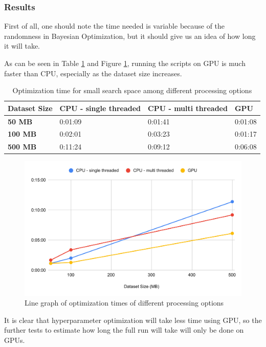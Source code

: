 \documentclass[12pt,twoside]{report}
\begin{document}
\subsubsection{Results}

First of all, one should note the time needed is variable because of the randomness in Bayesian Optimization, but it should give us an idea of how long it will take.

As can be seen in Table \ref{tab:cpu-gpu} and Figure \ref{fig:cpu-gpu}, running the scripts on GPU is much faster than CPU, especially as the dataset size increases.

\begin{table}[h]
\centering
\begin{tabular}{|l|l|l|l|}
\hline
\textbf{Dataset Size} & \textbf{CPU - single threaded} & \textbf{CPU - multi threaded} & \textbf{GPU} \\ \hline
\textbf{50 MB}  & 0:01:09 & 0:01:41 & 0:01:08 \\ \hline
\textbf{100 MB} & 0:02:01 & 0:03:23 & 0:01:17 \\ \hline
\textbf{500 MB} & 0:11:24 & 0:09:12 & 0:06:08 \\ \hline
\end{tabular}
\caption{Optimization time for small search space among different processing options}
\label{tab:cpu-gpu}
\end{table}

\begin{figure}[h]
\centering
\includegraphics[width = 0.8\hsize]{figures/efficiency/cpu-gpu.pdf}
\caption{Line graph of optimization times of different processing options}
\label{fig:cpu-gpu}
\end{figure}

It is clear that hyperparameter optimization will take less time using GPU, so the further tests to estimate how long the full run will take will only be done on GPUs.
\end{document}

